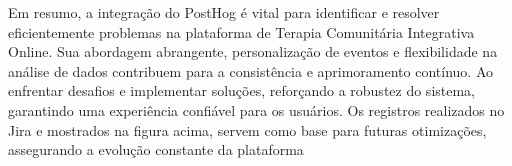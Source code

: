  Em resumo, a integração do PostHog é vital para identificar e resolver eficientemente problemas na plataforma de Terapia Comunitária Integrativa Online. Sua abordagem abrangente, personalização de eventos e flexibilidade na análise de dados contribuem para a consistência e aprimoramento contínuo. Ao enfrentar desafios e implementar soluções, reforçando a robustez do sistema, garantindo uma experiência confiável para os usuários. Os registros realizados no Jira e mostrados na figura acima, servem como base para futuras otimizações, assegurando a evolução constante da plataforma
 
 
 
 
 

 
 




